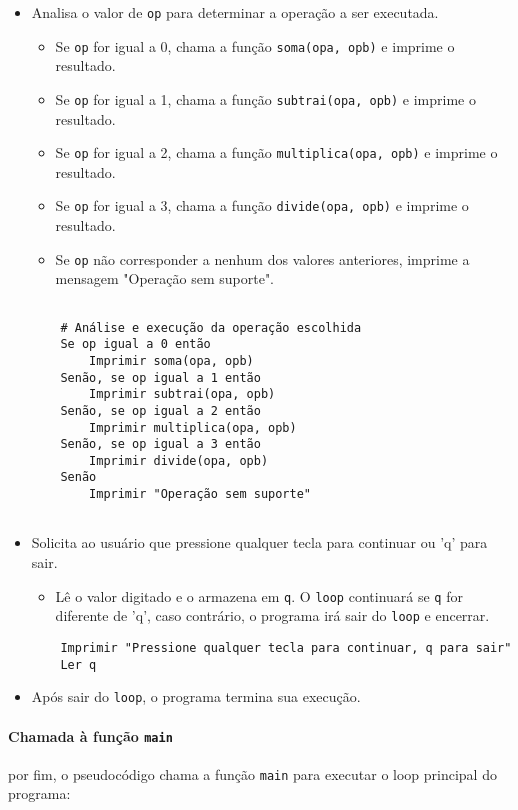 \documentclass[a4paper, 12pt, onecolumn,singlespacing]{article}
\begin{document}
\begin{itemize}
\begin{verbatim}
\end{verbatim}
	\item Analisa o valor de \texttt{op} para determinar a operação a ser executada.
	\begin{itemize}
		\item Se \texttt{op} for igual a 0, chama a função \texttt{soma(opa, opb)} e imprime o resultado.
		\item Se \texttt{op} for igual a 1, chama a função \texttt{subtrai(opa, opb)} e imprime o resultado.
		\item Se \texttt{op} for igual a 2, chama a função \texttt{multiplica(opa, opb)} e imprime o resultado.
		\item Se \texttt{op} for igual a 3, chama a função \texttt{divide(opa, opb)} e imprime o resultado.
		\item Se \texttt{op} não corresponder a nenhum dos valores anteriores, imprime a mensagem "Operação sem suporte".
	\end{itemize}
\begin{verbatim}
	
	# Análise e execução da operação escolhida
	Se op igual a 0 então
		Imprimir soma(opa, opb)
	Senão, se op igual a 1 então
		Imprimir subtrai(opa, opb)
	Senão, se op igual a 2 então
		Imprimir multiplica(opa, opb)
	Senão, se op igual a 3 então
		Imprimir divide(opa, opb)
	Senão
		Imprimir "Operação sem suporte"
	
\end{verbatim}
	\item Solicita ao usuário que pressione qualquer tecla para continuar ou 'q' para sair.
	\begin{itemize}
		\item Lê o valor digitado e o armazena em \texttt{q}. O \texttt{loop} continuará se \texttt{q} for diferente de 'q', caso contrário, o programa irá sair do \texttt{loop} e encerrar.
	\end{itemize}
\begin{verbatim}
	Imprimir "Pressione qualquer tecla para continuar, q para sair"
	Ler q
\end{verbatim}
	\item Após sair do \texttt{loop}, o programa termina sua execução.
\end{itemize}

\paragraph{Chamada à função \texttt{main}} por fim, o pseudocódigo chama a função \texttt{main} para executar o loop principal do programa:
\end{document}
